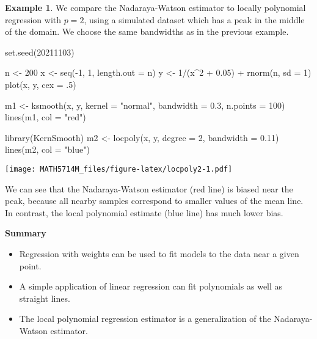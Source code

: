\documentclass[
  a4paper,
]{article}
\newenvironment{Shaded}{\begin{snugshade}}{\end{snugshade}}
\newcommand{\AttributeTok}[1]{\textcolor[rgb]{0.77,0.63,0.00}{#1}}
\newcommand{\DecValTok}[1]{\textcolor[rgb]{0.00,0.00,0.81}{#1}}
\newcommand{\FloatTok}[1]{\textcolor[rgb]{0.00,0.00,0.81}{#1}}
\newcommand{\FunctionTok}[1]{\textcolor[rgb]{0.00,0.00,0.00}{#1}}
\newcommand{\NormalTok}[1]{#1}
\newcommand{\OtherTok}[1]{\textcolor[rgb]{0.56,0.35,0.01}{#1}}
\newcommand{\SpecialCharTok}[1]{\textcolor[rgb]{0.00,0.00,0.00}{#1}}
\newcommand{\StringTok}[1]{\textcolor[rgb]{0.31,0.60,0.02}{#1}}
\providecommand{\tightlist}{%
  \setlength{\itemsep}{0pt}\setlength{\parskip}{0pt}}
\theoremstyle{definition}
\theoremstyle{definition}
\newtheorem{example}{Example}[section]
\theoremstyle{definition}
\theoremstyle{definition}
\theoremstyle{remark}
\begin{document}
\begin{example}
We compare the Nadaraya-Watson estimator to locally polynomial regression
with \(p=2\), using a simulated dataset which has a peak in the middle of the
domain. We choose the same bandwidths as in the previous example.

\begin{Shaded}
\begin{Highlighting}[]
\FunctionTok{set.seed}\NormalTok{(}\DecValTok{20211103}\NormalTok{)}

\NormalTok{n }\OtherTok{\textless{}{-}} \DecValTok{200}
\NormalTok{x }\OtherTok{\textless{}{-}} \FunctionTok{seq}\NormalTok{(}\SpecialCharTok{{-}}\DecValTok{1}\NormalTok{, }\DecValTok{1}\NormalTok{, }\AttributeTok{length.out =}\NormalTok{ n)}
\NormalTok{y }\OtherTok{\textless{}{-}} \DecValTok{1}\SpecialCharTok{/}\NormalTok{(x}\SpecialCharTok{\^{}}\DecValTok{2} \SpecialCharTok{+} \FloatTok{0.05}\NormalTok{) }\SpecialCharTok{+} \FunctionTok{rnorm}\NormalTok{(n, }\AttributeTok{sd =} \DecValTok{1}\NormalTok{)}
\FunctionTok{plot}\NormalTok{(x, y, }\AttributeTok{cex =}\NormalTok{ .}\DecValTok{5}\NormalTok{)}

\NormalTok{m1 }\OtherTok{\textless{}{-}} \FunctionTok{ksmooth}\NormalTok{(x, y, }\AttributeTok{kernel =} \StringTok{"normal"}\NormalTok{, }\AttributeTok{bandwidth =} \FloatTok{0.3}\NormalTok{, }\AttributeTok{n.points =} \DecValTok{100}\NormalTok{)}
\FunctionTok{lines}\NormalTok{(m1, }\AttributeTok{col =} \StringTok{"red"}\NormalTok{)}

\FunctionTok{library}\NormalTok{(KernSmooth)}
\NormalTok{m2 }\OtherTok{\textless{}{-}} \FunctionTok{locpoly}\NormalTok{(x, y, }\AttributeTok{degree =} \DecValTok{2}\NormalTok{, }\AttributeTok{bandwidth =} \FloatTok{0.11}\NormalTok{)}
\FunctionTok{lines}\NormalTok{(m2, }\AttributeTok{col =} \StringTok{"blue"}\NormalTok{)}
\end{Highlighting}
\end{Shaded}

\texttt{[image: MATH5714M\_files/figure-latex/locpoly2-1.pdf]}

We can see that the Nadaraya-Watson estimator (red line) is biased near the
peak, because all nearby samples correspond to smaller values of the mean line.
In contrast, the local polynomial estimate (blue line) has much lower bias.
\end{example}

\textbf{Summary}

\begin{itemize}
\tightlist
\item
  Regression with weights can be used to fit models to the data near
  a given point.
\item
  A simple application of linear regression can fit polynomials as well
  as straight lines.
\item
  The local polynomial regression estimator is a generalization of the
  Nadaraya-Watson estimator.
\end{itemize}
\end{document}

